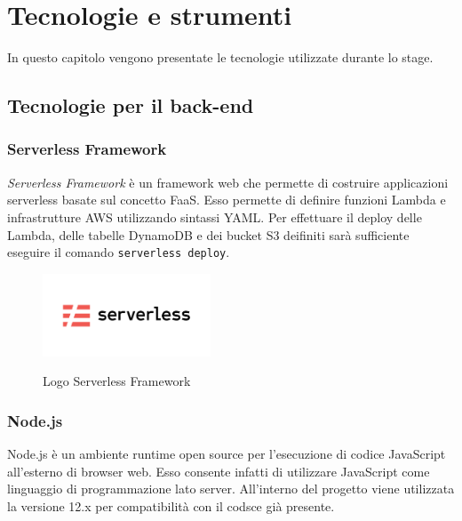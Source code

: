 
\chapter{Tecnologie e strumenti}
\label{cap:tecnologie}

In questo capitolo vengono presentate le tecnologie utilizzate durante lo stage.\\

\section{Tecnologie per il back-end}
	\subsection{Serverless Framework}
	\emph{Serverless Framework} è un \gls{framework} web che permette di costruire applicazioni \gls{serverless} basate sul concetto \gls{FaaS}. Esso permette di definire funzioni Lambda e infrastrutture \gls{AWS} utilizzando sintassi \gls{YAML}.
	Per effettuare il \gls{deploy} delle Lambda, delle tabelle DynamoDB e dei bucket S3 deifiniti sarà sufficiente eseguire il comando \texttt{serverless deploy}.
	
	\begin{figure}[H]
		\centering
		\includegraphics[width=5cm]{immagini/serverless.png} \\
		\caption{\label{fig:logo_serverless} Logo Serverless Framework}
	\end{figure}
	
	\subsection{Node.js}
	Node.js è un ambiente runtime open source per l'esecuzione di codice JavaScript all'esterno di browser web. Esso consente infatti di utilizzare JavaScript come linguaggio di programmazione lato server. All'interno del progetto
	viene utilizzata la versione 12.x per compatibilità con il codsce già presente.
	
